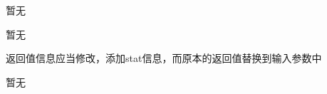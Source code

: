 \begin{DoxyRefList}
%
暂无  
\item[成员 \mbox{\hyperlink{namespace_utility_1_1_numerical_a5932b4c8b0de61de2476bd46c2306b2d}{Utility::Numerical::Least\+Square\+Fitting}} (std\+::vector$<$ double $>$ \&v, std\+::vector$<$ double $>$ \&b, std\+::vector$<$ std\+::function$<$ double(double)$>$ $>$ \&f, std\+::vector$<$ double $>$ \&w)]\label{todo__todo000003}%
%
暂无  
\item[成员 \mbox{\hyperlink{namespace_utility_1_1_numerical_abdc7139623bdae1909c9fc438a3ccf0a}{Utility::Numerical::Mutli\+Linear\+Least\+Square\+Fitting}} (std\+::vector$<$ double $>$ \&A, std\+::vector$<$ double $>$ \&b, int n, int m)]\label{todo__todo000004}%
%
返回值信息应当修改，添加stat信息，而原本的返回值替换到输入参数中  
\item[成员 \mbox{\hyperlink{namespace_utility_1_1_numerical_a9af1d3a02a8d82bbb20ac1b16ec9d44b}{Utility::Numerical::Romberg\+Integration}} (const double begin, const double end, std\+::function$<$ double(double)$>$ fun, const double converge)]\label{todo__todo000001}%
%
暂无 
\end{DoxyRefList}